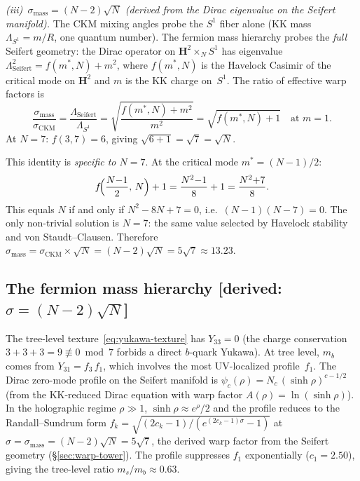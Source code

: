 \emph{(iii)~$\sigma_{\mathrm{mass}} = (N{-}2)\sqrt{N}$
(derived from the Dirac eigenvalue on the Seifert manifold).}
The CKM mixing angles probe the $S^1$ fiber alone
(KK mass $\Lambda_{S^1} = m/R$, one quantum number).
The fermion mass hierarchy probes the \emph{full}
Seifert geometry: the Dirac operator on
$\mathbf{H}^2 \times_N S^1$ has eigenvalue
$\Lambda_{\mathrm{Seifert}}^2 = f(m^*,N) + m^2$,
where $f(m^*,N)$ is the Havelock Casimir of the critical
mode on $\mathbf{H}^2$ and $m$ is the KK charge on~$S^1$.
The ratio of effective warp factors is
\[
  \frac{\sigma_{\mathrm{mass}}}{\sigma_{\mathrm{CKM}}}
  = \frac{\Lambda_{\mathrm{Seifert}}}{\Lambda_{S^1}}
  = \sqrt{\frac{f(m^*,N) + m^2}{m^2}}
  = \sqrt{f(m^*,N) + 1}
  \quad\text{at } m = 1.
\]
At $N = 7$: $f(3,7) = 6$, giving
$\sqrt{6{+}1} = \sqrt{7} = \sqrt{N}$.

This identity is \emph{specific to $N = 7$}.
At the critical mode $m^* = (N{-}1)/2$:
\[
  f\!\Bigl(\frac{N{-}1}{2},\,N\Bigr) + 1
  = \frac{N^2{-}1}{8} + 1
  = \frac{N^2{+}7}{8}.
\]
This equals $N$ if and only if $N^2 - 8N + 7 = 0$,
i.e.\ $(N{-}1)(N{-}7) = 0$.
The only non-trivial solution is $N = 7$:
the same value selected by Havelock stability
and von Staudt--Clausen.
Therefore
$\sigma_{\mathrm{mass}}
= \sigma_{\mathrm{CKM}} \times \sqrt{N}
= (N{-}2)\sqrt{N}
= 5\sqrt{7} \approx 13.23$.

\subsection{The fermion mass hierarchy \textnormal{[derived: $\sigma = (N{-}2)\sqrt{N}$]}}
\label{sec:mass-hierarchy}

The tree-level texture~\eqref{eq:yukawa-texture} has $Y_{33} = 0$
(the charge conservation $3{+}3{+}3 = 9 \not\equiv 0 \bmod 7$
forbids a direct $b$-quark Yukawa).
At tree level, $m_b$ comes from $Y_{31} = f_3\,f_1$, which
involves the most UV-localized profile~$f_1$.
The Dirac zero-mode profile on the Seifert manifold is
$\psi_c(\rho) = N_c\,(\sinh\rho)^{c-1/2}$
(from the KK-reduced Dirac equation with warp factor
$A(\rho) = \ln(\sinh\rho)$).
In the holographic regime
$\rho \gg 1$, $\sinh\rho \approx e^\rho/2$ and the
profile reduces to the Randall--Sundrum form
$f_k = \sqrt{(2c_k{-}1)/(e^{(2c_k-1)\sigma}{-}1)}$
at $\sigma = \sigma_{\mathrm{mass}} = (N{-}2)\sqrt{N} = 5\sqrt{7}$,
the derived warp factor from the Seifert geometry
(\S\ref{sec:warp-tower}).
The profile suppresses $f_1$ exponentially ($c_1 = 2.50$),
giving the tree-level ratio $m_s/m_b \approx 0.63$.

